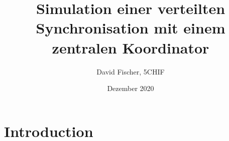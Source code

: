\documentclass[12pt, letterpaper]{article}
\title{Simulation einer verteilten Synchronisation mit einem zentralen Koordinator}
\author{David Fischer, 5CHIF}
\date{Dezember 2020}
\begin{document}
\begin{titlepage}
\maketitle
\end{titlepage}

\tableofcontents
\newpage

\section{Introduction}
\end{document}
